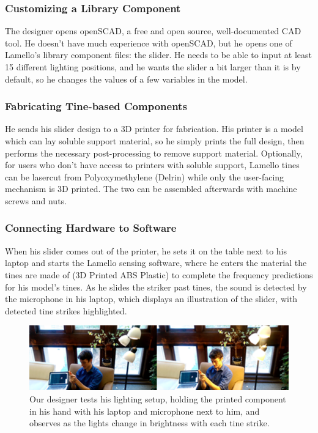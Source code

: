      \subsubsection{Customizing a Library Component}
    The designer opens openSCAD, a free and open source, well-documented CAD tool. He doesn't have much experience with openSCAD, but he opens one of Lamello's library component files: the slider. He needs to be able to input at least 15 different lighting positions, and he wants the slider a bit larger than it is by default, so he changes the values of a few variables in the model. 
    
     \subsubsection{Fabricating Tine-based Components}
    He sends his slider design to a 3D printer for fabrication. His printer is a model which can lay soluble support material, so he simply prints the full design, then performs the necessary post-processing to remove support material. Optionally, for users who don't have access to printers with soluble support, Lamello tines can be lasercut from Polyoxymethylene (Delrin) while only the user-facing mechanism is 3D printed. The two can be assembled afterwards with machine screws and nuts.
    
    \subsubsection{Connecting Hardware to Software}
    
    When his slider comes out of the printer, he sets it on the table next to his laptop and starts the Lamello sensing software, where he enters the material the tines are made of (3D Printed ABS Plastic) to complete the frequency predictions for his model's tines. As he slides the striker past tines, the sound is detected by the microphone in his laptop, which displays an illustration of the slider, with detected tine strikes highlighted.
    
    \begin{figure}
  \centering
    \includegraphics[width=\textwidth]{figures/lamello/andrew-light.png}
  \caption{Our designer tests his lighting setup, holding the printed component in his hand with his laptop and microphone next to him, and observes as the lights change in brightness with each tine strike.} 
  \label{fig:lamello-andrew}
\end{figure}
    
